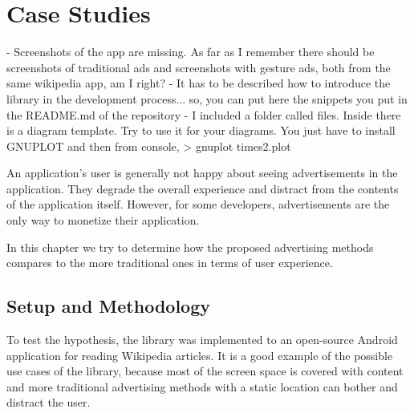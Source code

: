 
\chapter{Case Studies} %


- Screenshots of the app are missing. As far as I remember there should be screenshots of traditional ads and screenshots with gesture ads, both from the same wikipedia app, am I right?
- It has to be described how to introduce the library in the development process... so, you can put here the snippets you put in the README.md of the repository
- I included a folder called files. Inside there is a diagram template. Try to use it for your diagrams. You just have to install GNUPLOT and then from console, > gnuplot times2.plot



An application's user is generally not happy about seeing advertisements in the application. They degrade the overall experience and distract from the contents of the application itself. However, for some developers, advertisements are the only way to monetize their application.

In this chapter we try to determine how the proposed advertising methods compares to the more traditional ones in terms of user experience.


\ifpdf
    \graphicspath{{X/figures/PNG/}{X/figures/PDF/}{X/figures/}}
\else
    \graphicspath{{X/figures/EPS/}{X/figures/}}
\fi


%	
%

\section{Setup and Methodology}

To test the hypothesis, the library was implemented to an open-source Android application for reading Wikipedia articles. It is a good example of the possible use cases of the library, because most of the screen space is covered with content and more traditional advertising methods with a static location can bother and distract the user.

